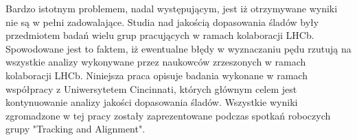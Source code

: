 Bardzo istotnym problemem, nadal występującym, jest iż otrzymywane wyniki nie są w pełni zadowalające. Studia nad jakością dopasowania śladów były przedmiotem badań wielu grup pracujących w ramach kolaboracji LHCb. Spowodowane jest to faktem, iż ewentualne błędy w wyznaczaniu pędu rzutują na wszystkie analizy wykonywane przez naukowców zrzeszonych w ramach kolaboracji LHCb.  
Niniejsza praca opisuje badania wykonane w ramach współpracy z Uniwersytetem Cincinnati, których głównym celem jest kontynuowanie analizy jakości dopasowania śladów. Wszystkie wyniki zgromadzone w tej pracy zostały zaprezentowane podczas spotkań roboczych grupy "Tracking and Alignment".



